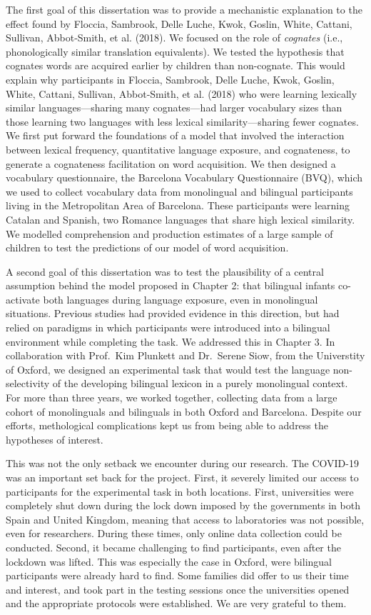 \documentclass[
  12pt,
  b5paperpaper,
  twoside]{scrreprt}
\begin{document}
\begin{spacing}{1.5}
{The first goal of this dissertation was to provide a mechanistic
explanation to the effect found by Floccia, Sambrook, Delle Luche, Kwok,
Goslin, White, Cattani, Sullivan, Abbot‐Smith, et al. (2018). We focused
on the role of \emph{cognates} (i.e., phonologically similar translation
equivalents). We tested the hypothesis that cognates words are acquired
earlier by children than non-cognate. This would explain why
participants in Floccia, Sambrook, Delle Luche, Kwok, Goslin, White,
Cattani, Sullivan, Abbot‐Smith, et al. (2018) who were learning
lexically similar languages---sharing many cognates---had larger
vocabulary sizes than those learning two languages with less lexical
similarity---sharing fewer cognates. We first put forward the
foundations of a model that involved the interaction between lexical
frequency, quantitative language exposure, and cognateness, to generate
a cognateness facilitation on word acquisition. We then designed a
vocabulary questionnaire, the Barcelona Vocabulary Questionnaire (BVQ),
which we used to collect vocabulary data from monolingual and bilingual
participants living in the Metropolitan Area of Barcelona. These
participants were learning Catalan and Spanish, two Romance languages
that share high lexical similarity. We modelled comprehension and
production estimates of a large sample of children to test the
predictions of our model of word acquisition.

A second goal of this dissertation was to test the plausibility of a
central assumption behind the model proposed in Chapter 2: that
bilingual infants co-activate both languages during language exposure,
even in monolingual situations. Previous studies had provided evidence
in this direction, but had relied on paradigms in which participants
were introduced into a bilingual environment while completing the task.
We addressed this in Chapter 3. In collaboration with Prof.~Kim Plunkett
and Dr.~Serene Siow, from the Universtity of Oxford, we designed an
experimental task that would test the language non-selectivity of the
developing bilingual lexicon in a purely monolingual context. For more
than three years, we worked together, collecting data from a large
cohort of monolinguals and bilinguals in both Oxford and Barcelona.
Despite our efforts, methological complications kept us from being able
to address the hypotheses of interest.

This was not the only setback we encounter during our research. The
COVID-19 was an important set back for the project. First, it severely
limited our access to participants for the experimental task in both
locations. First, universities were completely shut down during the lock
down imposed by the governments in both Spain and United Kingdom,
meaning that access to laboratories was not possible, even for
researchers. During these times, only online data collection could be
conducted. Second, it became challenging to find participants, even
after the lockdown was lifted. This was especially the case in Oxford,
were bilingual participants were already hard to find. Some families did
offer to us their time and interest, and took part in the testing
sessions once the universities opened and the appropriate protocols were
established. We are very grateful to them.

}
\end{spacing}
\end{document}
